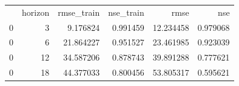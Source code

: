 \begin{tabular}{lrrrrr}
 & horizon & rmse_train & nse_train & rmse & nse \\
0 & 3 & 9.176824 & 0.991459 & 12.234458 & 0.979068 \\
0 & 6 & 21.864227 & 0.951527 & 23.461985 & 0.923039 \\
0 & 12 & 34.587206 & 0.878743 & 39.891288 & 0.777621 \\
0 & 18 & 44.377033 & 0.800456 & 53.805317 & 0.595621 \\
\end{tabular}
